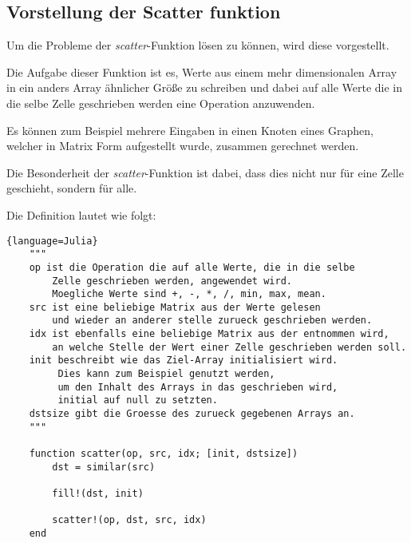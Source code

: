\subsection{Vorstellung der Scatter funktion} \label{vorstellung}

Um die Probleme der \textit{scatter}-Funktion lösen zu können, 
wird diese vorgestellt.

Die Aufgabe dieser Funktion ist es, Werte aus einem mehr dimensionalen Array 
in ein anders Array ähnlicher Größe zu schreiben 
und dabei auf alle Werte die in die selbe Zelle geschrieben werden eine Operation anzuwenden.


Es können zum Beispiel mehrere Eingaben in einen Knoten eines Graphen, 
welcher in Matrix Form aufgestellt wurde,
zusammen gerechnet werden.

Die Besonderheit der \textit{scatter}-Funktion ist dabei, 
dass dies nicht nur für eine Zelle geschieht, sondern für alle.

Die Definition lautet wie folgt:

\begin{lstlisting}{language=Julia}
	"""
	op ist die Operation die auf alle Werte, die in die selbe 
	    Zelle geschrieben werden, angewendet wird.
		Moegliche Werte sind +, -, *, /, min, max, mean.
	src ist eine beliebige Matrix aus der Werte gelesen 
	    und wieder an anderer stelle zurueck geschrieben werden.
	idx ist ebenfalls eine beliebige Matrix aus der entnommen wird,
	    an welche Stelle der Wert einer Zelle geschrieben werden soll.
	init beschreibt wie das Ziel-Array initialisiert wird.
	     Dies kann zum Beispiel genutzt werden, 
		 um den Inhalt des Arrays in das geschrieben wird, 
		 initial auf null zu setzten.
	dstsize gibt die Groesse des zurueck gegebenen Arrays an.
	"""

	function scatter(op, src, idx; [init, dstsize])
		dst = similar(src)
		
		fill!(dst, init)
		
		scatter!(op, dst, src, idx)
	end
\end{lstlisting}

